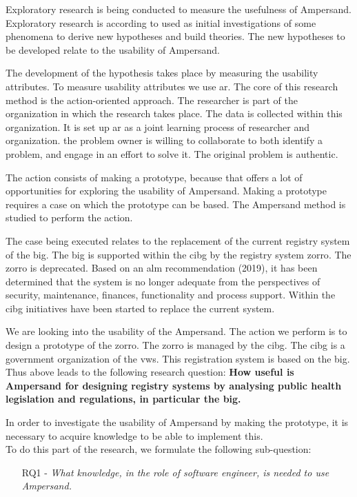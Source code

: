 Exploratory research is being conducted to measure the usefulness of Ampersand.
Exploratory research is according to \cite{Easterbrook} used as initial investigations of some phenomena to derive new hypotheses and build theories.
The new hypotheses to be developed relate to the usability of Ampersand.

The development of the hypothesis takes place by measuring the usability attributes.
To measure usability attributes we use \acrshort{ar}\citep{Easterbrook}.
The core of this research method is the action-oriented approach.
The researcher is part of the organization in which the research takes place.
The data is collected within this organization.
It is set up \acrshort{ar} as a joint learning process of researcher and organization.
the problem owner is willing to collaborate to both identify a problem, and engage in an effort to solve it.
The original problem is authentic.

The action consists of making a prototype, because that offers a lot of opportunities for exploring the usability of Ampersand.
Making a prototype requires a case on which the prototype can be based.
The Ampersand method is studied to perform the action.

The case being executed relates to the replacement of the current registry system of the \acrshort{big}.
The \acrfull{big} is supported within the \acrshort{cibg} by the registry system \acrfull{zorro}.
The \acrshort{zorro} is deprecated.
Based on an \acrfull{alm} recommendation (2019)\citep{de_kok_analyse_2019}, it has been determined that the system is no longer adequate from the perspectives of security, maintenance, finances, functionality and process support.
Within the \acrshort{cibg} initiatives have been started to replace the current system.

We are looking into the usability of the Ampersand.
The action we perform is to design a prototype of the \acrshort{zorro}.
The \acrshort{zorro} is managed by the \acrshort{cibg}.
The \acrshort{cibg} is a government organization of the \acrlong{vws}.
This registration system is based on the \acrshort{big}.
Thus above leads to the following research question:
\newline
\textbf{How useful is Ampersand for designing registry systems by analysing public health legislation and regulations, in particular the \acrshort{big}.}

In order to investigate the usability of Ampersand by making the prototype, it is necessary to acquire knowledge to be able to implement this.
\\To do this part of the research, we formulate the following sub-question:
\begin{enumerate}
    \item[RQ1]- \textit{What knowledge, in the role of software engineer, is needed to use Ampersand.}
\end{enumerate}

